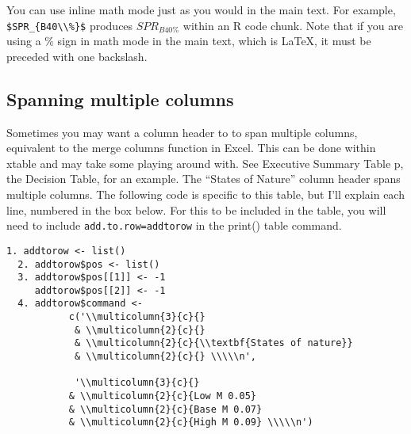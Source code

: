 \documentclass[12pt,]{article}
\begin{document}
You can use inline math mode just as you would in the main text. For
example, \texttt{\$SPR\_\{B40\textbackslash{}\textbackslash{}\%\}\$}
produces \(SPR_{B40\%}\) within an R code chunk. Note that if you are
using a \% sign in math mode in the main text, which is LaTeX, it must
be preceded with one backslash.

\subsection{Spanning multiple columns}\label{spanning-multiple-columns}

Sometimes you may want a column header to to span multiple columns,
equivalent to the merge columns function in Excel. This can be done
within xtable and may take some playing around with. See Executive
Summary Table p, the Decision Table, for an example. The ``States of
Nature'' column header spans multiple columns. The following code is
specific to this table, but I'll explain each line, numbered in the box
below. For this to be included in the table, you will need to include
\verb|add.to.row=addtorow| in the print() table command.

\begin{Verbatim}[frame=single]
  1. addtorow <- list()
  2. addtorow$pos <- list()
  3. addtorow$pos[[1]] <- -1
     addtorow$pos[[2]] <- -1
  4. addtorow$command <- 
           c('\\multicolumn{3}{c}{} 
            & \\multicolumn{2}{c}{} 
            & \\multicolumn{2}{c}{\\textbf{States of nature}} 
            & \\multicolumn{2}{c}{} \\\\\n', 
           
            '\\multicolumn{3}{c}{} 
           & \\multicolumn{2}{c}{Low M 0.05} 
           & \\multicolumn{2}{c}{Base M 0.07} 
           & \\multicolumn{2}{c}{High M 0.09} \\\\\n')
        
\end{Verbatim}
\end{document}
